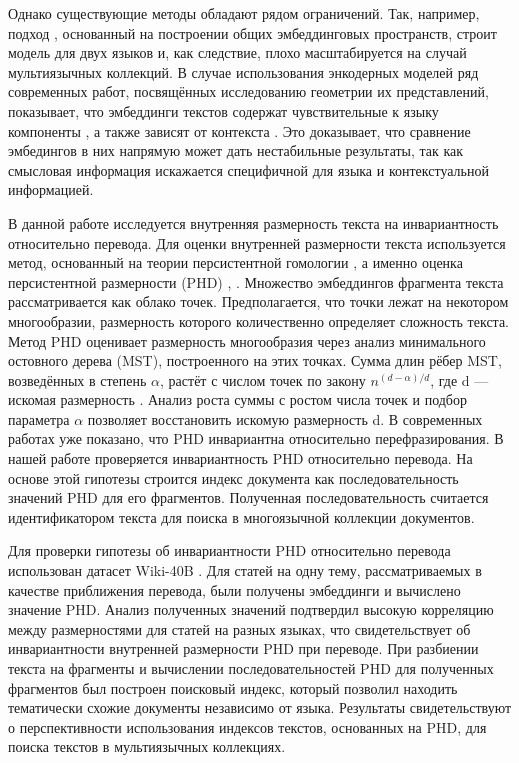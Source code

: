 \documentclass{article}
\begin{document}
Однако существующие методы обладают рядом ограничений. Так, например, подход \cite{Vulic2015-ve}, основанный на построении общих эмбеддинговых пространств, строит модель для двух языков и, как следствие, плохо масштабируется на случай мультиязычных коллекций. В случае использования энкодерных моделей ряд современных работ, посвящённых исследованию геометрии их представлений, показывает, что эмбеддинги текстов содержат чувствительные к языку компоненты \cite{chang2022geometrymultilinguallanguagemodel}, а также зависят от контекста \cite{ethayarajh2019contextualcontextualizedwordrepresentations}. Это доказывает, что сравнение эмбедингов в них напрямую может дать нестабильные результаты, так как смысловая информация искажается специфичной для языка и контекстуальной информацией.

В данной работе исследуется внутренняя размерность текста на инвариантность относительно перевода. Для оценки внутренней размерности текста используется метод, основанный на теории персистентной гомологии \cite{S_A_Barannikov1994-fw}, а именно оценка персистентной размерности (PHD) \cite{Adams_2020}, \cite{schweinhart2019persistenthomologyupperbox}. Множество эмбеддингов фрагмента текста рассматривается как облако точек. Предполагается, что точки лежат на некотором многообразии, размерность которого количественно определяет сложность текста. Метод PHD оценивает размерность многообразия через анализ минимального остовного дерева (MST), построенного на этих точках. Сумма длин рёбер MST, возведённых в степень $\alpha$, растёт с числом точек по закону $n^{(d - \alpha)/d}$, где d — искомая размерность \cite{birdal2021intrinsicdimensionpersistenthomology}. Анализ роста суммы с ростом числа точек и подбор параметра $\alpha$ позволяет восстановить искомую размерность d. В современных работах \cite{tulchinskii2023intrinsicdimensionestimationrobust} уже показано, что PHD инвариантна относительно перефразирования. В нашей работе проверяется инвариантность PHD относительно перевода. На основе этой гипотезы строится индекс документа как последовательность значений PHD для его фрагментов. Полученная последовательность считается идентификатором текста для поиска в многоязычной коллекции документов.

Для проверки гипотезы об инвариантности PHD относительно перевода использован датасет Wiki-40B \cite{guo-etal-2020-wiki}. Для статей на одну тему, рассматриваемых в качестве приближения перевода, были получены эмбеддинги и вычислено значение PHD. Анализ полученных значений подтвердил высокую корреляцию между размерностями для статей на разных языках, что свидетельствует об инвариантности внутренней размерности PHD при переводе. При разбиении текста на фрагменты и вычислении последовательностей PHD для полученных фрагментов был построен поисковый индекс, который позволил находить тематически схожие документы независимо от языка. Результаты свидетельствуют о перспективности использования индексов текстов, основанных на PHD, для поиска текстов в мультиязычных коллекциях.
\end{document}
